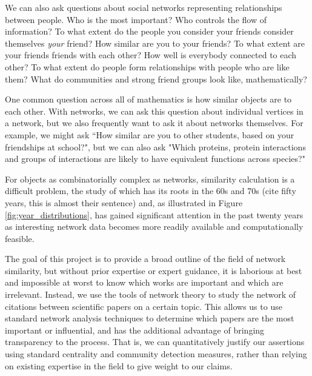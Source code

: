 \documentclass[12pt]{thesis}
\theoremstyle{plain}
\theoremstyle{definition}
\theoremstyle{remark}
\begin{document}
We can also ask questions about social networks representing relationships between people. Who is the most important? Who controls the flow of information? To what extent do the people you consider your friends consider themselves \textit{your} friend?  How similar are you to your friends? To what extent are your friends friends with each other? How well is everybody connected to each other? To what extent do people form relationships with people who are like them? What do communities and strong friend groups look like, mathematically?

One common question across all of mathematics is how similar objects are to each other. With networks, we can ask this question about individual vertices in a network, but we also frequently want to ask it about networks themselves. For example, we might ask ``How similar are you to other students, based on your friendships at school?", but we can also ask "Which proteins, protein interactions and groups of interactions are likely to have equivalent functions across species?" %

For objects as combinatorially complex as networks, similarity calculation is a difficult problem, the study of which has its roots in the 60s and 70s (cite fifty years, this is almost their sentence) and, as illustrated in Figure \ref{fig:year_distributions}, has gained significant attention in the past twenty years as interesting network data becomes more readily available and computationally feasible.

The goal of this project is to provide a broad outline of the field of network similarity, but without prior expertise or expert guidance, it is laborious at best and impossible at worst to know which works are important and which are irrelevant. Instead, we use the tools of network theory to study the network of citations between scientific papers on a certain topic. This allows us to use standard network analysis techniques to determine which papers are the most important or influential, and has the additional advantage of bringing transparency to the process. That is, we can quantitatively justify our assertions using standard centrality and community detection measures, rather than relying on existing expertise in the field to give weight to our claims.
\end{document}

